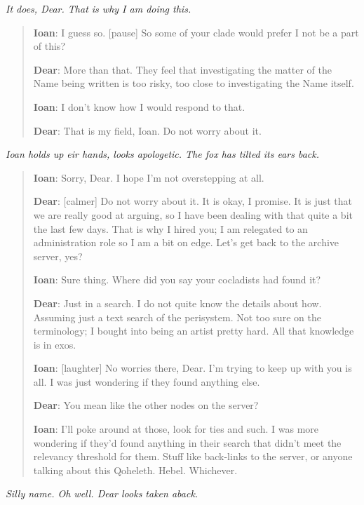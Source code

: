\emph{It does, Dear. That is why I am doing this.}

\begin{quote}
\textbf{Ioan}: I guess so. {[}pause{]} So some of your clade would prefer I not be a part of this?

\textbf{Dear}: More than that. They feel that investigating the matter of the Name being written is too risky, too close to investigating the Name itself.

\textbf{Ioan}: I don't know how I would respond to that.

\textbf{Dear}: That is my field, Ioan. Do not worry about it.
\end{quote}

\emph{Ioan holds up eir hands, looks apologetic. The fox has tilted its ears back.}

\begin{quote}
\textbf{Ioan}: Sorry, Dear. I hope I'm not overstepping at all.

\textbf{Dear}: {[}calmer{]} Do not worry about it. It is okay, I promise. It is just that we are really good at arguing, so I have been dealing with that quite a bit the last few days. That is why I hired you; I am relegated to an administration role so I am a bit on edge. Let's get back to the archive server, yes?

\textbf{Ioan}: Sure thing. Where did you say your cocladists had found it?

\textbf{Dear}: Just in a search. I do not quite know the details about how. Assuming just a text search of the perisystem. Not too sure on the terminology; I bought into being an artist pretty hard. All that knowledge is in exos.

\textbf{Ioan}: {[}laughter{]} No worries there, Dear. I'm trying to keep up with you is all. I was just wondering if they found anything else.

\textbf{Dear}: You mean like the other nodes on the server?

\textbf{Ioan}: I'll poke around at those, look for ties and such. I was more wondering if they'd found anything in their search that didn't meet the relevancy threshold for them. Stuff like back-links to the server, or anyone talking about this Qoheleth. Hebel. Whichever.
\end{quote}

\emph{Silly name. Oh well. Dear looks taken aback.}

